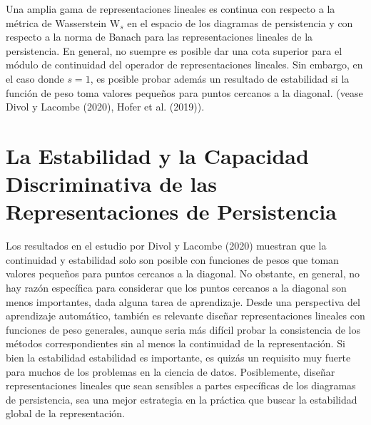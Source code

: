 Una amplia gama de representaciones lineales es continua con respecto a la m\'etrica
de Wasserstein $\mathrm{W}_{s}$ en el espacio de los diagramas de persistencia y
con respecto a la norma de Banach para las representaciones lineales de la persistencia.
En general, no suempre es posible dar una cota superior para el m\'odulo de continuidad
del operador de representaciones lineales. Sin embargo, en el caso donde $s=1$, es posible
probar adem\'as un resultado de estabilidad si la funci\'on de peso toma valores peque\~{n}os
para puntos cercanos a la diagonal. (vease Divol y Lacombe (2020)\cite{Divol2021},
Hofer et al. (2019)\cite{Hofer2019b}).

\section*{La Estabilidad y la Capacidad Discriminativa de las Representaciones de Persistencia}

Los resultados en el estudio por Divol y Lacombe (2020)\cite{Divol2021} muestran que
la continuidad y estabilidad solo son posible con funciones de pesos que toman valores peque\~{n}os
para puntos cercanos a la diagonal. No obstante, en general, no hay raz\'on espec\'ifica para
considerar que los puntos cercanos a la diagonal son menos importantes, dada alguna tarea de aprendizaje.
Desde una perspectiva del aprendizaje autom\'atico, tambi\'en es relevante dise\~{n}ar
representaciones lineales con funciones de peso generales, aunque seria m\'as dif\'icil probar
la consistencia de los m\'etodos correspondientes sin al menos la continuidad de la representaci\'on.
Si bien la estabilidad estabilidad es importante, es quiz\'as un requisito muy fuerte
para muchos de los problemas en la ciencia de datos.
Posiblemente, dise\~{n}ar representaciones lineales que sean sensibles a partes espec\'ificas de los
diagramas de persistencia, sea una mejor estrategia en la pr\'actica
que buscar la estabilidad global de la representaci\'on.